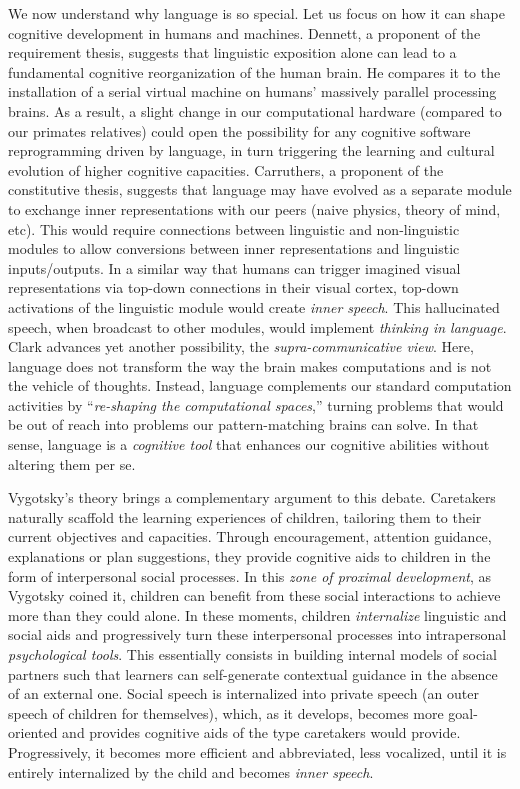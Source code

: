 We now understand why language is so special. Let us focus on how it can shape cognitive development in humans and machines. Dennett, a proponent of the requirement thesis, suggests that linguistic exposition alone can lead to a fundamental cognitive reorganization of the human brain.\cite{dennett_consciousness_1993} He compares it to the installation of a serial virtual machine on humans' massively parallel processing brains. As a result, a slight change in our computational hardware (\eg compared to our primates relatives) could open the possibility for any cognitive software reprogramming driven by language, in turn triggering the learning and cultural evolution of higher cognitive capacities.
Carruthers, a proponent of the constitutive thesis, suggests that language may have evolved as a separate module to exchange inner representations with our peers (naive physics, theory of mind, etc). This would require connections between linguistic and non-linguistic modules to allow conversions between inner representations and linguistic inputs/outputs. In a similar way that humans can trigger imagined visual representations via top-down connections in their visual cortex, top-down activations of the linguistic module would create \textit{inner speech}. This hallucinated speech, when broadcast to other modules, would implement \textit{thinking in language}.\cite{carruthers1998thinking} Clark advances yet another possibility, the \textit{supra-communicative view}. Here, language does not transform the way the brain makes computations and is not the vehicle of thoughts. Instead, language complements our standard computation activities by ``\textit{re-shaping the computational spaces},'' turning problems that would be out of reach into problems our pattern-matching brains can solve.\cite{carruthers_magic_1998} In that sense, language is a \textit{cognitive tool} that enhances our cognitive abilities without altering them per se. 

Vygotsky's theory brings a complementary argument to this debate. Caretakers naturally scaffold the learning experiences of children, tailoring them to their current objectives and capacities. Through encouragement, attention guidance, explanations or plan suggestions, they provide cognitive aids to children in the form of interpersonal social processes.\cite{vygotsky_thought_1934} In this \textit{zone of proximal development}, as Vygotsky coined it, children can benefit from these social interactions to achieve more than they could alone. In these moments, children \textit{internalize} linguistic and social aids and progressively turn these interpersonal processes into intrapersonal \textit{psychological tools}.\cite{vygotsky_thought_1934}	 This essentially consists in building internal models of social partners such that learners can self-generate contextual guidance in the absence of an external one. Social speech is internalized into private speech (an outer speech of children for themselves), which, as it develops, becomes more goal-oriented and provides cognitive aids of the type caretakers would provide.\cite{vygotsky_thought_1934,berk_why_1994} Progressively, it becomes more efficient and abbreviated, less vocalized, until it is entirely internalized by the child and becomes \textit{inner speech}. 

